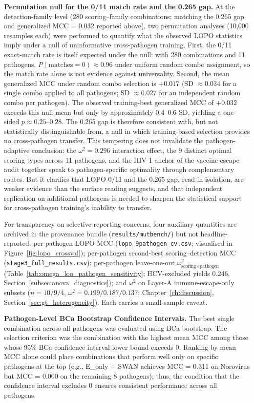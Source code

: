 \textbf{Permutation null for the 0/11 match rate and the 0.265 gap.}
At the detection-family level (280 scoring--family combinations; matching the 0.265 gap and generalized MCC = 0.032 reported above), two permutation analyses (10{,}000 resamples each) were performed to quantify what the observed LOPO statistics imply under a null of uninformative cross-pathogen training.
First, the 0/11 exact-match rate is itself expected under the null: with 280 combinations and 11 pathogens, $P(\text{matches}=0) \approx 0.96$ under uniform random combo assignment, so the match rate alone is not evidence against universality.
Second, the mean generalized MCC under random combo selection is $+0.017$ (SD $\approx 0.034$ for a single combo applied to all pathogens; SD $\approx 0.027$ for an independent random combo per pathogen). The observed training-best generalized MCC of $+0.032$ exceeds this null mean but only by approximately $0.4$--$0.6$ SD, yielding a one-sided $p \approx 0.25$--$0.28$. The 0.265 gap is therefore consistent with, but not statistically distinguishable from, a null in which training-based selection provides no cross-pathogen transfer.
This tempering does not invalidate the pathogen-adaptive conclusion: the $\omega^2 = 0.296$ interaction effect, the 9 distinct optimal scoring types across 11 pathogens, and the HIV-1 anchor of the vaccine-escape audit together speak to pathogen-specific optimality through complementary routes. But it clarifies that LOPO-0/11 and the 0.265 gap, read in isolation, are weaker evidence than the surface reading suggests, and that independent replication on additional pathogens is needed to sharpen the statistical support for cross-pathogen training's inability to transfer.

For transparency on selective-reporting concerns, four auxiliary quantities are archived in the provenance bundle (\texttt{results/mutbench/}) but not headline-reported: per-pathogen LOPO MCC (\texttt{lopo\_9pathogen\_cv.csv}; visualised in Figure~\ref{fig:lopo_crossval}); per-pathogen second-best scoring--detection MCC (\texttt{stage3\_full\_results.csv}); per-pathogen leave-one-out $\omega^2_{\text{scoring} \times \text{pathogen}}$ (Table~\ref{tab:omega_loo_pathogen_sensitivity}; HCV-excluded yields 0.246, Section~\ref{subsec:anova_diagnostics}); and $\omega^2$ on Layer-A immune-escape-only subsets ($n = 10/9/4$, $\omega^2 = 0.199/0.187/0.137$; Chapter~\ref{ch:discussion}, Section~\ref{sec:gt_heterogeneity}). Each carries a small-sample caveat.

\textbf{Pathogen-Level BCa Bootstrap Confidence Intervals.}
\label{subsec:9pathogen_bootstrap}
The best single combination across all pathogens was evaluated using BCa bootstrap.
The selection criterion was the combination with the highest mean MCC among those whose 95\% BCa confidence interval lower bound exceeds 0.
Ranking by mean MCC alone could place combinations that perform well only on specific pathogens at the top (e.g., E\_only + SWAN achieves MCC = 0.311 on Norovirus but MCC = 0.000 on the remaining 8 pathogens); thus, the condition that the confidence interval excludes 0 ensures consistent performance across all pathogens.

